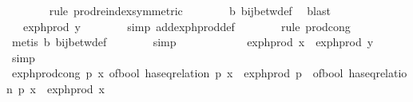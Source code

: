 \begin{isabellebody}
\ \ \ \ \ \ \isamarkupfalse%
\ {\isacharparenleft}{\kern0pt}rule\ prod{\isachardot}{\kern0pt}reindex{\isacharbrackleft}{\kern0pt}symmetric{\isacharbrackright}{\kern0pt}{\isacharparenright}{\kern0pt}\isanewline
\ \ \ \ \ \ \isamarkupfalse%
\ b\ bij{\isacharunderscore}{\kern0pt}betw{\isacharunderscore}{\kern0pt}def\ \isamarkupfalse%
\ blast\isanewline
\ \ \ \ \isamarkupfalse%
\ \isamarkupfalse%
\ {\isachardoublequoteopen}{\isachardot}{\kern0pt}{\isachardot}{\kern0pt}{\isachardot}{\kern0pt}\ {\isacharequal}{\kern0pt}\ exp{\isacharunderscore}{\kern0pt}h{\isacharunderscore}{\kern0pt}prod\ y{\isachardoublequoteclose}\isanewline
\ \ \ \ \ \ \isamarkupfalse%
\ {\isacharparenleft}{\kern0pt}simp\ add{\isacharcolon}{\kern0pt}exp{\isacharunderscore}{\kern0pt}h{\isacharunderscore}{\kern0pt}prod{\isacharunderscore}{\kern0pt}def{\isacharparenright}{\kern0pt}\isanewline
\ \ \ \ \ \ \isamarkupfalse%
\ {\isacharparenleft}{\kern0pt}rule\ prod{\isachardot}{\kern0pt}cong{\isacharparenright}{\kern0pt}\isanewline
\ \ \ \ \ \ \ \isamarkupfalse%
\ {\isacharparenleft}{\kern0pt}metis\ b\ bij{\isacharunderscore}{\kern0pt}betw{\isacharunderscore}{\kern0pt}def{\isacharparenright}{\kern0pt}\isanewline
\ \ \ \ \ \ \isamarkupfalse%
\ simp\isanewline
\ \ \ \ \isanewline
\ \ \ \ \isamarkupfalse%
\ \isamarkupfalse%
\ {\isachardoublequoteopen}exp{\isacharunderscore}{\kern0pt}h{\isacharunderscore}{\kern0pt}prod\ x\ {\isacharequal}{\kern0pt}\ exp{\isacharunderscore}{\kern0pt}h{\isacharunderscore}{\kern0pt}prod\ y{\isachardoublequoteclose}\ \isamarkupfalse%
\ simp\isanewline
\ \ \isamarkupfalse%
\isanewline
\isanewline
\ \ \isamarkupfalse%
\ exp{\isacharunderscore}{\kern0pt}h{\isacharunderscore}{\kern0pt}prod{\isacharunderscore}{\kern0pt}cong{\isacharcolon}{\kern0pt}\ {\isachardoublequoteopen}{\isasymAnd}p\ x{\isachardot}{\kern0pt}\ of{\isacharunderscore}{\kern0pt}bool\ {\isacharparenleft}{\kern0pt}has{\isacharunderscore}{\kern0pt}eq{\isacharunderscore}{\kern0pt}relation\ p\ x{\isacharparenright}{\kern0pt}\ {\isacharasterisk}{\kern0pt}\ exp{\isacharunderscore}{\kern0pt}h{\isacharunderscore}{\kern0pt}prod\ p\ {\isacharequal}{\kern0pt}\ of{\isacharunderscore}{\kern0pt}bool\ {\isacharparenleft}{\kern0pt}has{\isacharunderscore}{\kern0pt}eq{\isacharunderscore}{\kern0pt}relation\ p\ x{\isacharparenright}{\kern0pt}\ {\isacharasterisk}{\kern0pt}\ exp{\isacharunderscore}{\kern0pt}h{\isacharunderscore}{\kern0pt}prod\ x{\isachardoublequoteclose}\ \isanewline

\end{isabellebody}
